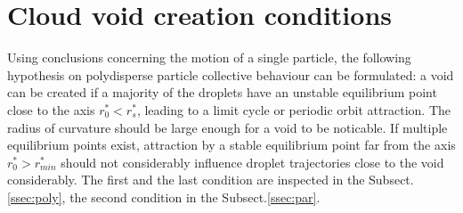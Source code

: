 \documentclass[../main.tex]{subfiles}
\begin{document}
\section{Cloud void creation conditions}
\label{sec:void}
Using conclusions concerning the motion of a single particle, the following hypothesis on polydisperse particle collective behaviour can be formulated: a void can be created if a majority of the droplets have an unstable equilibrium point close to the axis $r^{\ast}_0<r^{\ast}_s$, leading to a limit cycle or periodic orbit attraction. The radius of curvature should be large enough for a void to be noticable. If multiple equilibrium points exist, attraction by a stable equilibrium point far from the axis $r^{\ast}_0>r^{\ast}_{min}$ should not considerably influence droplet trajectories close to the void considerably. The first and the last condition are inspected in the Subsect.\ref{ssec:poly}, the second  condition in the  Subsect.\ref{ssec:par}.
\end{document}
